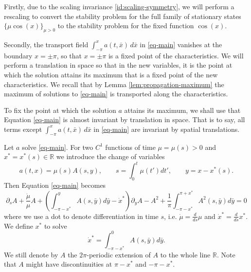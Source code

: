 \documentclass[12pt]{amsart}
\numberwithin{equation}{section}
\numberwithin{equation}{section}
\newcommand{\cpcomment}[1]{\ \newline\textcolor{darkblue}{+++++++++++++++++++++}\newline
\textcolor{darkblue}{#1}\newline\textcolor{darkblue}{+++++++++++++++++++++}\newline
}
\begin{document}
Firstly, due to the scaling invariance \eqref{id:scaling-symmetry}, we will perform a rescaling to convert the stability problem for the full family of stationary states $\{\mu \cos(x)\}_{\mu>0}$ to the stability problem for the fixed function $\cos(x)$.

Secondly, the transport field $\int_{-\pi}^x a(t, \bar x) \,d\bar x$ in \eqref{eq-main} vanishes at the boundary $x=\pm\pi$, so that $x=\pm\pi$ is a fixed point of the characteristics. We will perform a translation in space so that in the new variables, it is the point at which the solution attains its maximum that is a fixed point of the new characteristics. We recall that by Lemma \ref{lem:propagation-maximum} the maximum of solutions to \eqref{eq-main} is transported along the characteristics.

To fix the point at which the solution $a$ attains its maximum, we shall use that Equation \eqref{eq-main} is almost invariant by translation in space. That is to say, all terms except $\int_{-\pi}^x  a(t, \bar x) \,d\bar x$ in \eqref{eq-main} are invariant by spatial translations.

Let $a$ solve \eqref{eq-main}. For two $C^1$ functions of time  $\mu=\mu(s)>0$ and $x^*=x^*(s)\in \mathbb R$ we introduce the change of variables
\begin{equation} \label{self-similar-variables}
a(t,x)=\mu(s)A(s,y), \qquad s=\int_0^t \mu(t')dt', \qquad y=x-x^*(s).
\end{equation}
Then Equation \eqref{eq-main} becomes
$$
\partial_s A+\frac{\dot{\mu}}{\mu} A +\left( \int_{-\pi-x^*}^y A(s,\bar y)d\bar y-\dot{x}^* \right)\partial_y A-A^2+\frac{1}{\pi}\int_{-\pi-x^*}^{\pi+x^*} A^2(s,\bar y)d\bar y=0
$$
where we use a dot to denote differentiation in time $s$, i.e. $\dot{\mu} =\frac{d}{ds}\mu$ and $\dot{x}^* =\frac{d}{ds}x^*$. 
We define $x^*$ to solve
\begin{equation} \label{modulation-equation-x*}
\dot{x}^* =\int_{-\pi-x^*}^0 A(s,\bar y)d\bar y.
\end{equation}
We still denote by $A$ the $2\pi$-periodic extension of $A$ to the whole line $\mathbb R$. Note that $A$ might have discontinuities at $\pi-x^*$ and $-\pi-x^*$.
\end{document}

